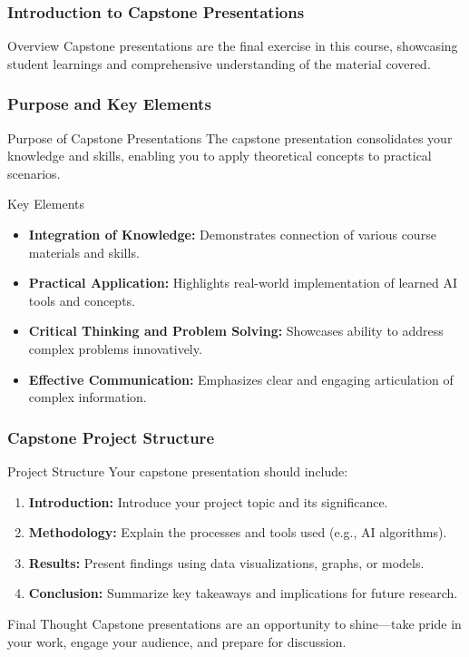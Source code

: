 \documentclass[aspectratio=169]{beamer}
\begin{document}
\frame{\titlepage}

\begin{frame}[fragile]
    \frametitle{Introduction to Capstone Presentations}
    \begin{block}{Overview}
        Capstone presentations are the final exercise in this course, showcasing student learnings and comprehensive understanding of the material covered.
    \end{block}
\end{frame}

\begin{frame}[fragile]
    \frametitle{Purpose and Key Elements}
    \begin{block}{Purpose of Capstone Presentations}
        The capstone presentation consolidates your knowledge and skills, enabling you to apply theoretical concepts to practical scenarios.
    \end{block}
    
    \begin{block}{Key Elements}
        \begin{itemize}
            \item \textbf{Integration of Knowledge:} Demonstrates connection of various course materials and skills.
            \item \textbf{Practical Application:} Highlights real-world implementation of learned AI tools and concepts.
            \item \textbf{Critical Thinking and Problem Solving:} Showcases ability to address complex problems innovatively.
            \item \textbf{Effective Communication:} Emphasizes clear and engaging articulation of complex information.
        \end{itemize}
    \end{block}
\end{frame}

\begin{frame}[fragile]
    \frametitle{Capstone Project Structure}
    \begin{block}{Project Structure}
        Your capstone presentation should include:
        \begin{enumerate}
            \item \textbf{Introduction:} Introduce your project topic and its significance.
            \item \textbf{Methodology:} Explain the processes and tools used (e.g., AI algorithms).
            \item \textbf{Results:} Present findings using data visualizations, graphs, or models.
            \item \textbf{Conclusion:} Summarize key takeaways and implications for future research.
        \end{enumerate}
    \end{block}

    \begin{block}{Final Thought}
        Capstone presentations are an opportunity to shine—take pride in your work, engage your audience, and prepare for discussion.
    \end{block}
\end{frame}
\end{document}
